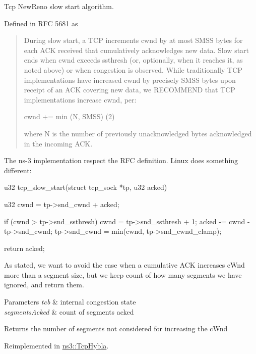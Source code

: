 Tcp New\+Reno slow start algorithm. 

Defined in R\+FC 5681 as

\begin{quote}
During slow start, a T\+CP increments cwnd by at most S\+M\+SS bytes for each A\+CK received that cumulatively acknowledges new data. Slow start ends when cwnd exceeds ssthresh (or, optionally, when it reaches it, as noted above) or when congestion is observed. While traditionally T\+CP implementations have increased cwnd by precisely S\+M\+SS bytes upon receipt of an A\+CK covering new data, we R\+E\+C\+O\+M\+M\+E\+ND that T\+CP implementations increase cwnd, per\+:

cwnd += min (N, S\+M\+SS) (2)

where N is the number of previously unacknowledged bytes acknowledged in the incoming A\+CK. \end{quote}


The ns-\/3 implementation respect the R\+FC definition. Linux does something different\+: \begin{DoxyVerb}u32 tcp_slow_start(struct tcp_sock *tp, u32 acked)
  {
    u32 cwnd = tp->snd_cwnd + acked;

    if (cwnd > tp->snd_ssthresh)
      cwnd = tp->snd_ssthresh + 1;
    acked -= cwnd - tp->snd_cwnd;
    tp->snd_cwnd = min(cwnd, tp->snd_cwnd_clamp);

    return acked;
  }\end{DoxyVerb}


As stated, we want to avoid the case when a cumulative A\+CK increases c\+Wnd more than a segment size, but we keep count of how many segments we have ignored, and return them.


\begin{DoxyParams}{Parameters}
{\em tcb} & internal congestion state \\
\hline
{\em segments\+Acked} & count of segments acked \\
\hline
\end{DoxyParams}
\begin{DoxyReturn}{Returns}
the number of segments not considered for increasing the c\+Wnd 
\end{DoxyReturn}


Reimplemented in \hyperlink{classns3_1_1TcpHybla_a374c804fcaf21e2cd4c51f0ff6003798}{ns3\+::\+Tcp\+Hybla}.



